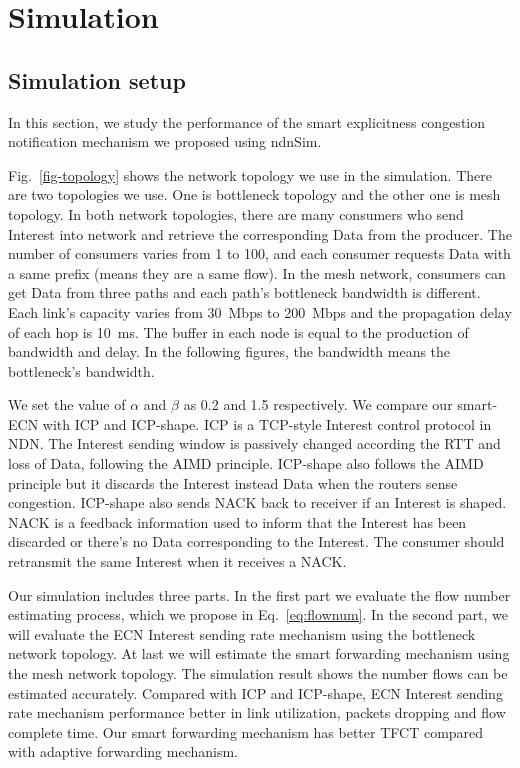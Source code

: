 
\section{Simulation}

\label{sec:simulation}

\subsection{Simulation setup}
In this section, we study the performance of the smart explicitness congestion notification mechanism we proposed using ndnSim\cite{ndnsimnet, ndnsim}.

Fig.~\ref{fig-topology} shows the network topology we use in the simulation. There are two topologies we use. One is bottleneck topology and the other one is mesh topology. In both network topologies, there are many consumers who send Interest into network and retrieve the corresponding Data from the producer. The number of consumers varies from 1 to 100, and each consumer requests Data with a same prefix (means they are a same flow). In the mesh network, consumers can get Data from three paths and each path's bottleneck bandwidth is different. Each link's capacity varies from 30~Mbps to 200~Mbps and the propagation delay of each hop is 10~ms. The buffer in each node is equal to the production of bandwidth and delay. In the following figures, the bandwidth means the bottleneck's bandwidth.

We set the value of $\alpha$ and $\beta$ as 0.2 and 1.5 respectively. We compare our smart-ECN with ICP and ICP-shape. ICP is a TCP-style Interest control protocol in NDN. The Interest sending window is passively changed according the RTT and loss of Data, following the AIMD principle\cite{ICP}. ICP-shape also follows the AIMD principle but it discards the Interest instead Data when the routers sense congestion\cite{improveshape}. ICP-shape also sends NACK back to receiver if an Interest is shaped. NACK is a feedback information used to inform that the Interest has been discarded or there's no Data corresponding to the Interest. The consumer should retransmit the same Interest when it receives a NACK.

Our simulation includes three parts. In the first part we evaluate the flow number estimating process, which we propose in Eq.~\ref{eq:flownum}. In the second part, we will evaluate the ECN Interest sending rate mechanism using the bottleneck network topology. At last we will estimate the smart forwarding mechanism using the mesh network topology. The simulation result shows the number flows can be estimated accurately. Compared with ICP and ICP-shape, ECN Interest sending rate mechanism performance better in link utilization, packets dropping and flow complete time. Our smart forwarding mechanism has better TFCT compared with adaptive forwarding mechanism.

